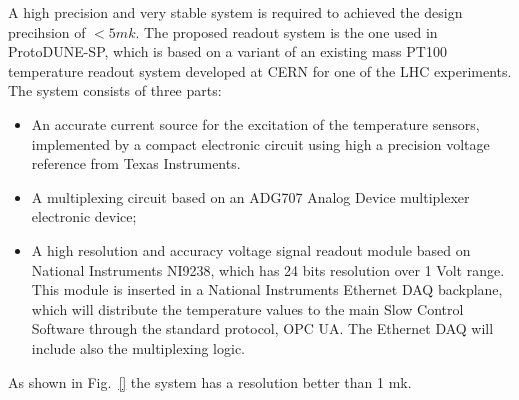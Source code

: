 A high precision and very stable system is required to achieved the design precihsion of $< 5 mk$.
The proposed readout system is the one used in ProtoDUNE-SP, which is based on a variant of an existing mass PT100 temperature readout system developed at
CERN for one of the LHC experiments. The system consists of three parts:
\begin{itemize}
\item An accurate current source for the excitation of the temperature sensors, implemented by a compact electronic circuit using high a precision voltage reference from Texas Instruments. 
\item A multiplexing circuit based on an ADG707 Analog Device multiplexer electronic device;
\item A high resolution and accuracy voltage signal readout module based on National Instruments NI9238, which has 24 bits resolution over 1 Volt range.
  This module is inserted in a National Instruments Ethernet DAQ backplane, which will distribute the temperature values to the main Slow Control Software
  through the standard protocol, OPC UA. The Ethernet DAQ will include also the multiplexing logic.
\end{itemize}

As shown in Fig.~\ref{} the system has a resolution better than 1 mk.  
